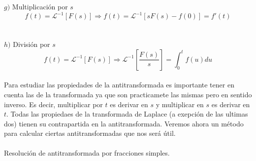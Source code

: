 \documentclass[]{article}
\begin{document}
$g)$ Multiplicación por $s$
$$
f(t) = \mathscr{L}^{-1}[F(s)] \Rightarrow f(t) = \mathscr{L}^{-1}[sF(s)-f(0)] = f'(t) 
$$
\\
\\
$h)$ División por $s$
$$
f(t) = \mathscr{L}^{-1}[F(s)] \Rightarrow \mathscr{L}^{-1}[\frac{F(s)}{s}] = \int_0^{t} f(u)du
$$
\\
Para estudiar las propiedades de la antitransformada es importante tener en cuenta las de la transformada ya que son practicamete las mismas pero en sentido inverso. Es decir, multiplicar por $t$ es derivar en $s$ y multiplicar en $s$ es derivar en $t$. Todas las propiedaes de la transformada de Laplace (a exepción de las ultimas dos) tienen su contrapartida en la antitransformada. Veremos ahora un método para calcular ciertas antitransformadas que nos será útil.
\\
\\
\large Resolución de antitransformada por fracciones simples.
\normalsize









	
\end{document}

